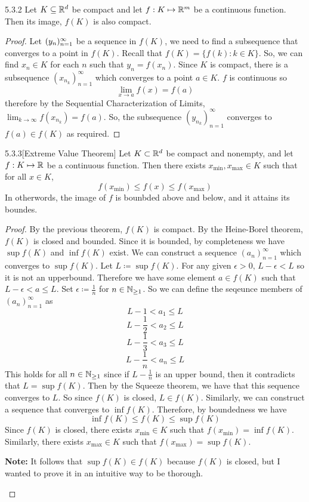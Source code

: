 \documentclass[openany]{report}
\begin{document}
\begin{manualtheorem}{5.3.2}
    Let $K \subseteq \mathbb{R}^d$ be compact and let $f: K \mapsto \mathbb{R}^m$ be a continuous function. Then its image, $f(K)$ is also compact. 
\end{manualtheorem}
\begin{proof}
    Let $({y}_n)_{n=1}^\infty$ be a sequence in $f(K)$, we need to find a subsequence that converges to a point in $f(K)$. Recall that $f(K) = \{f(k): k \in K\}$. So, we can find $x_n \in K$ for each $n$ such that $y_n = f(x_n)$. Since $K$ is compact, there is a subsequence $(x_{n_k})_{n=1}^\infty$ which converges to a point $a \in K$. $f$ is continuous so 
    \[\lim_{x\rightarrow a} f(x) = f(a)\]
    therefore by the Sequential Characterization of Limits, $\lim_{k \rightarrow \infty} f(x_{n_k} ) = f(a)$. So, the subsequence $(y_{n_k})_{n=1}^\infty$ converges to $f(a) \in f(K)$ as required.
\end{proof}

\begin{manualcorollary}{5.3.3}[Extreme Value Theorem]
    Let $K \subset \mathbb{R}^d$ be compact and nonempty, and let $f: K \mapsto \mathbb{R}$ be a continuous function. Then there exists $x_{\min}, x_{\max} \in K$ such that for all $x \in K$, 
    \[f(x_{\min}) \leq f(x) \leq f(x_{\max})\]
    In otherwords, the image of $f$ is bounbded above and below, and it attains its boundes. 
\end{manualcorollary}
\begin{proof}
    By the previous theorem, $f(K)$ is compact. By the Heine-Borel theorem, $f(K)$ is closed and bounded. Since it is bounded, by completeness we have $\sup f(K)$ and $\inf f(K)$ exist. We can construct a sequence $(a_n)_{n=1}^\infty$ which converges to $\sup f(K)$. Let $L \coloneqq \sup f(K)$. For any given $\epsilon > 0$, $L - \epsilon < L$ so it is not an upperbound. Therefore we have some element $a \in f(K)$ such that $L - \epsilon < a \leq L$. Set $\epsilon \coloneqq \frac{1}{n}$ for $n \in \mathbb{N}_{\geq 1}$. So we can define the seqeunce members of $(a_n)_{n=1}^\infty$ as 
    \[L - 1 < a_1 \leq L\]
    \[L - \frac{1}{2} < a_2 \leq L\]
    \[L - \frac{1}{3} < a_3 \leq L\]
    \[L - \frac{1}{n} < a_n \leq L\]
    This holds for all $n \in \mathbb{N}_{\geq1}$ since if $L - \frac{1}{n}$ is an upper bound, then it contradicts that $L = \sup f(K)$. Then by the Squeeze theorem, we have that this sequence converges to $L$. So since $f(K)$ is closed, $L \in f(K)$. Similarly, we can construct a sequence that converges to $\inf f(K)$. Therefore, by boundedness we have 
    \[\inf f(K) \leq f(K) \leq \sup f(K) \]
    Since $f(K)$ is closed, there exists $x_{\min} \in K$ such that $f(x_{\min}) = \inf f(K)$. Similarly, there exists $x_{\max} \in K$ such that $f(x_{\max}) = \sup f(K)$. 
    \begin{center}
        \textbf{Note:} It follows that $\sup f(K) \in f(K)$ because $f(K)$ is closed, but I wanted to prove it in an intuitive way to be thorough.
    \end{center}
\end{proof}
\end{document}
